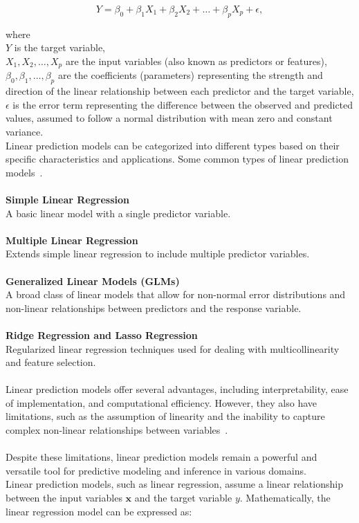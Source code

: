 \documentclass[12pt]{report}
\begin{document}
\begin{equation}\label{eq1}
    Y = \beta_0 + \beta_1 X_1 + \beta_2 X_2 + \ldots + \beta_p X_p + \epsilon,
\end{equation}

\noindent where\\
\( Y \) is the target variable,\\
\( X_1, X_2, \ldots, X_p \) are the input variables (also known as predictors or features),\\
\( \beta_0, \beta_1, \ldots, \beta_p \) are the coefficients (parameters) representing the strength and direction of the linear relationship between each predictor and the target variable,\\
\( \epsilon \) is the error term representing the difference between the observed and predicted values, assumed to follow a normal distribution with mean zero and constant variance.\\

\noindent Linear prediction models can be categorized into different types based on their
specific characteristics and applications. Some common types of linear prediction models~\cite{WOS:000788587300109, WOS:000426617000001}.\\
\\
\textbf{Simple Linear Regression}\\
A basic linear model with a single predictor variable.\\
\\
\textbf{Multiple Linear Regression}\\
Extends simple linear regression to include multiple predictor variables.\\
\\
\textbf{Generalized Linear Models (GLMs)}\\
A broad class of linear models that allow for non-normal error distributions
and non-linear relationships between predictors and the response variable.\\
\\
\textbf{Ridge Regression and Lasso Regression}\\
Regularized linear regression techniques used for dealing with multicollinearity and
feature selection.\\
\\
Linear prediction models offer several advantages, including interpretability, ease of
implementation, and computational efficiency. However, they also have limitations, such
as the assumption of linearity and the inability to capture complex non-linear
relationships between variables~\cite{WOS:000836807400001}.\\
\\
Despite these limitations, linear prediction models remain a powerful and versatile tool
for predictive modeling and inference in various domains.\\
Linear prediction models, such as linear regression, assume a linear relationship
between the input variables $\mathbf{x}$ and the target variable $y$. Mathematically,
the linear regression model can be expressed as:
\end{document}
